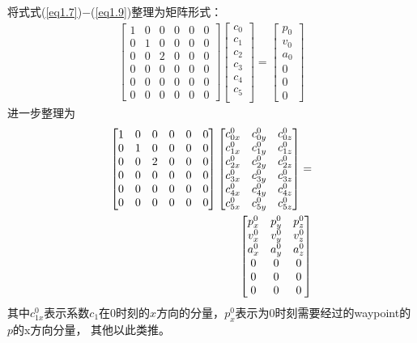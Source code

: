 \documentclass[40pt,a4paper,UTF8,twocolumn]{ctexart}%
\numberwithin{equation}{section}
\begin{document}
将式式(\ref{eq1.7})$-$(\ref{eq1.9})整理为矩阵形式：
\begin{align}
    \begin{bmatrix}
        1&0&0&0&0&0 \\
        0&1&0&0&0&0 \\
        0&0&2&0&0&0 \\
        0&0&0&0&0&0 \\
        0&0&0&0&0&0 \\
        0&0&0&0&0&0
    \end{bmatrix}
    \begin{bmatrix}
        c_0 \\ c_1 \\ c_2 \\ c_3 \\ c_4 \\ c_5 \\
    \end{bmatrix}
    =
    \begin{bmatrix}
        p_0\\v_0\\a_0 \\0\\0\\0
    \end{bmatrix}
\end{align}
进一步整理为
\begin{align}
    \begin{bmatrix}
        1&0&0&0&0&0 \\
        0&1&0&0&0&0 \\
        0&0&2&0&0&0 \\
        0&0&0&0&0&0 \\
        0&0&0&0&0&0 \\
        0&0&0&0&0&0
    \end{bmatrix}
    \begin{bmatrix}
        c_{0x}^0&c_{0y}^0&c_{0z}^0 \\
        c_{1x}^0&c_{1y}^0&c_{1z}^0 \\
        c_{2x}^0&c_{2y}^0&c_{2z}^0 \\
        c_{3x}^0&c_{3y}^0&c_{3z}^0 \\
        c_{4x}^0&c_{4y}^0&c_{4z}^0 \\
        c_{5x}^0&c_{5y}^0&c_{5z}^0 \\
    \end{bmatrix}
    = \notag \\
    \begin{bmatrix}
        p_{x}^0 &p_{y}^0 &p_{z}^0\\ 
        v_{x}^0 &v_{y}^0 &v_{z}^0\\
        a_{x}^0 &a_{y}^0 &a_{z}^0\\
        0&0&0 \\
        0&0&0 \\
        0&0&0
    \end{bmatrix}
    \label{eq1.11}
\end{align}
其中$c_{1x}^0$表示系数$c_1$在$0$时刻的$x$方向的分量，$p_{x}^0$表示为0时刻需要经过的waypoint的$p$的x方向分量，
其他以此类推。
\end{document}
